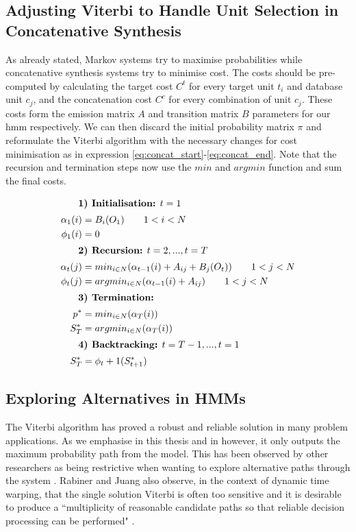 {{{{{{{{\subsection{Adjusting Viterbi to Handle Unit Selection in Concatenative Synthesis}

\label{sec:viterbi_unit_selection}

As already stated, Markov systems try to maximise probabilities while concatenative synthesis systems try to minimise cost. The costs should be pre-computed by calculating the target cost $C^{t}$ for every target unit $t_i$ and database unit $c_j$, and the concatenation cost $C^{c}$ for every combination of unit $c_j$. These costs form the emission matrix $A$ and transition matrix $B$ parameters for our \acrshort{hmm} respectively. We can then discard the initial probability matrix $\pi$ and reformulate the Viterbi algorithm with the necessary changes for cost minimisation as in expression \ref{eq:concat_start}-\ref{eq:concat_end}. Note that the recursion and termination steps now use the $min$ and $argmin$ function and sum the final costs. 

\setlength{\parindent}{1cm}

\indent
{
\begin{align}
\intertext{ \indent \textbf{1) Initialisation:} $t=1$}
			\alpha_1(i) &= B_{i}(O_1)\qquad1<i<N \nonumber \\
			\phi_1(i) &= 0 \label{eq:concat_start} \\
\intertext{ \indent \textbf{2) Recursion:} $t=2,...,t=T$}
			\alpha_t(j) &= min_{i\in N}(\alpha_{t-1}(i)+A_{ij}+B_{j}(O_{t}))\qquad1<j<N \nonumber \\
			\phi_t(j) &= argmin_{i\in N}(\alpha_{t-1}(i)+A_{ij})\qquad1<j<N\\
\intertext{ \indent \textbf{3) Termination:}}
			p^* &= min_{i \in N}(\alpha_T(i)) \nonumber \\
			S^*_{T} &= argmin_{i \in N}(\alpha_T(i))\\
\intertext{ \indent \textbf{4) Backtracking:} $t=T-1,...,t=1$}
			S^*_{T} &= \phi_t+1(S^*_{t+1}) \label{eq:concat_end}
\end{align}
}

\normalsize

\subsection{Exploring Alternatives in HMMs}

The Viterbi algorithm has proved a robust and reliable solution in many problem applications. As we emphasise in this thesis and in \cite{Nuanain2017} however, it only outputs the maximum probability path from the model. This has been observed by other researchers as being restrictive when wanting to explore alternative paths through the system \citep{Schwarz2003, Brown2010}. Rabiner and Juang also observe, in the context of dynamic time warping, that the single solution Viterbi is often too sensitive and it is desirable to produce a ``multiplicity of reasonable candidate paths so that reliable decision processing can be performed" \citep{Rabiner1993}. 

}}}}}}}}
